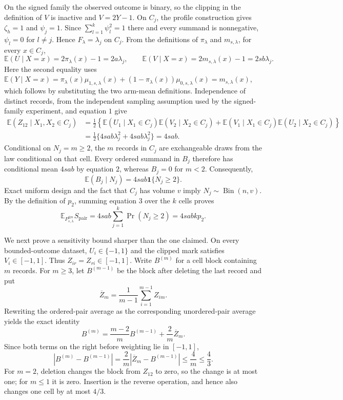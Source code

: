 On the signed family the observed outcome is binary, so the clipping in the definition of \(V\) is inactive and \(V=2Y-1\).  On \(C_j\), the profile construction gives \(\zeta_h=1\) and \(\psi_j=1\).  Since \(\sum_{l=1}^k\psi_l^2=1\) there and every summand is nonnegative, \(\psi_l=0\) for \(l\ne j\).  Hence \(F_\lambda=\lambda_j\) on \(C_j\).  From the definitions of \(\pi_\lambda\) and \(m_{s,\lambda}\), for every \(x\in C_j\),
\[
 \mathbb E(U\mid X=x)=2\pi_\lambda(x)-1=2a\lambda_j,
 \qquad
 \mathbb E(V\mid X=x)=2m_{s,\lambda}(x)-1=2sb\lambda_j. \tag{1}
\]
Here the second equality uses
\(\mathbb E(Y\mid X=x)=\pi_\lambda(x)\mu_{1,s,\lambda}(x)+(1-\pi_\lambda(x))\mu_{0,s,\lambda}(x)=m_{s,\lambda}(x)\), which follows by substituting the two arm-mean definitions.  Independence of distinct records, from the independent sampling assumption used by the signed-family experiment, and equation \(1\) give
\[
 \begin{aligned}
 \mathbb E(Z_{12}\mid X_1,X_2\in C_j)
 &=\frac12\left\{
       \mathbb E(U_1\mid X_1\in C_j)\mathbb E(V_2\mid X_2\in C_j)
      +\mathbb E(V_1\mid X_1\in C_j)\mathbb E(U_2\mid X_2\in C_j)
     \right\}\\
 &=\frac12\{4sab\lambda_j^2+4sab\lambda_j^2\}=4sab. \tag{2}
 \end{aligned}
\]
Conditional on \(N_j=m\ge2\), the \(m\) records in \(C_j\) are exchangeable draws from the law conditional on that cell.  Every ordered summand in \(B_j\) therefore has conditional mean \(4sab\) by equation \(2\), whereas \(B_j=0\) for \(m<2\).  Consequently,
\[
 \mathbb E(B_j\mid N_j)=4sab\mathbf 1\{N_j\ge2\}. \tag{3}
\]
Exact uniform design and the fact that \(C_j\) has volume \(v\) imply \(N_j\sim\operatorname{Bin}(n,v)\).  By the definition of \(p_2\), summing equation \(3\) over the \(k\) cells proves
\[
 \mathbb E_{P_{s,\lambda}^{\otimes n}}S_{\mathrm{pair}}
 =4sab\sum_{j=1}^k\Pr(N_j\ge2)=4sabkp_2. \tag{4}
\]

We next prove a sensitivity bound sharper than the one claimed.  On every bounded-outcome dataset, \(U_i\in\{-1,1\}\) and the clipped mark satisfies \(V_i\in[-1,1]\).  Thus \(Z_{ir}=Z_{ri}\in[-1,1]\).  Write \(B^{(m)}\) for a cell block containing \(m\) records.  For \(m\ge3\), let \(B^{(m-1)}\) be the block after deleting the last record and put
\[
 \overline Z_m=\frac1{m-1}\sum_{i=1}^{m-1}Z_{im}.
\]
Rewriting the ordered-pair average as the corresponding unordered-pair average yields the exact identity
\[
 B^{(m)}=\frac{m-2}{m}B^{(m-1)}+\frac2m\overline Z_m.
\]
Since both terms on the right before weighting lie in \([-1,1]\),
\[
 |B^{(m)}-B^{(m-1)}|
 =\frac2m|\overline Z_m-B^{(m-1)}|
 \le\frac4m\le\frac43. \tag{5}
\]
For \(m=2\), deletion changes the block from \(Z_{12}\) to zero, so the change is at most one; for \(m\le1\) it is zero.  Insertion is the reverse operation, and hence also changes one cell by at most \(4/3\).

